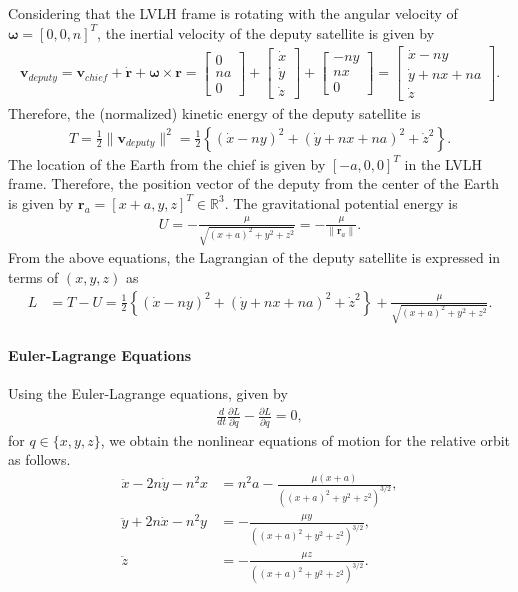 \documentclass[12pt,letterpaper]{ISSFD_v01}
\newcommand{\braces}[1]{\ensuremath{\left\{ #1 \right\}}}
\newcommand{\deriv}[2]{\ensuremath{\frac{\partial #1}{\partial #2}}}
\renewcommand{\Re}{\ensuremath{\mathbb{R}}}
\renewcommand{\r}{\mathbf{r}}
\begin{document}
Considering that the LVLH frame is rotating with the angular velocity of $\mathbf{\omega}=[0,0,n]^T$, the inertial velocity of the deputy satellite is given by
\begin{align*}
\mathbf{v}_{deputy}
=
\mathbf{v}_{chief} + \dot{\r} + \mathbf{\omega}\times \mathbf{r} = 
\begin{bmatrix}
0 \\ na \\ 0
\end{bmatrix}
+
\begin{bmatrix}
\dot x \\ \dot y \\ \dot z
\end{bmatrix}
+
\begin{bmatrix}
-n y \\ nx \\ 0
\end{bmatrix}
=
\begin{bmatrix}
\dot x - ny \\ \dot y + nx + na \\ \dot z
\end{bmatrix}.
\end{align*}
Therefore, the (normalized) kinetic energy of the deputy satellite is 
\begin{align*}
T = \frac{1}{2}\|\mathbf{v}_{deputy}\|^2 = \frac{1}{2} \braces{(\dot x -ny)^2+(\dot y + nx +na)^2 + \dot z^2}.
\end{align*}
The location of the Earth from the chief is given by $[-a,0,0]^T$ in the LVLH frame. Therefore, the position vector of the deputy from the center of the Earth is given by 
$\r_a=[x+a,y,z]^T\in\Re^3$. The gravitational potential energy is 
\begin{align*}
U = -\frac{\mu}{\sqrt{(x+a)^2 + y^2 + z^2}} = -\frac{\mu}{\|\r_a\|}.
\end{align*}
From the above equations, the Lagrangian of the deputy satellite is expressed in terms of $(x,y,z)$ as 
\begin{align}
L & = T-U = \frac{1}{2} \braces{(\dot x -ny)^2+(\dot y + nx +na)^2 + \dot z^2}
+\frac{\mu}{\sqrt{(x+a)^2 + y^2 + z^2}}.
\end{align}

\paragraph{Euler-Lagrange Equations}

Using the Euler-Lagrange equations, given by
\begin{align*}
\frac{d}{dt}\deriv{L}{\dot q}-\deriv{L}{q}=0,
\end{align*}
for $q\in\{x,y,z\}$, we obtain the nonlinear equations of motion for the relative orbit as follows.
\begin{align}
\ddot x - 2n\dot y -n^2 x&=n^2 a - \frac{\mu (x+a)}{((x+a)^2 + y^2 + z^2)^{3/2}},\label{eqn:ddotx}\\
\ddot y + 2n\dot x -n^2 y &=   - \frac{\mu y}{((x+a)^2 + y^2 + z^2)^{3/2}},\label{eqn:ddoty}\\
\ddot z &= - \frac{\mu z}{((x+a)^2 + y^2 + z^2)^{3/2}}.\label{eqn:ddotz}
\end{align}
\end{document}
